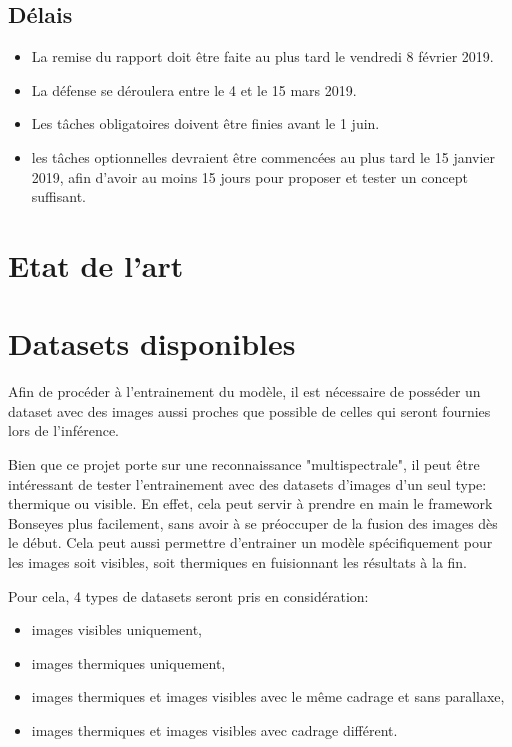 \subsection{Délais}
\begin{itemize}
	\item La remise du rapport doit être faite au plus tard le vendredi 8 février 2019.
	\item La défense se déroulera entre le 4 et le 15 mars 2019.
	\item Les tâches obligatoires doivent être finies avant le 1\ier{} juin.
	\item les tâches optionnelles devraient être commencées au plus tard le 15 janvier 2019, afin d'avoir au moins 15 jours pour proposer et tester un concept suffisant.
\end{itemize}


\section{Etat de l'art}


\section{Datasets disponibles}
Afin de procéder à l'entrainement du modèle, il est nécessaire de posséder un dataset avec des images aussi proches que possible de celles qui seront fournies lors de l'inférence.

Bien que ce projet porte sur une reconnaissance "multispectrale", il peut être intéressant de tester l'entrainement avec des datasets d'images d'un seul type: thermique ou visible.
En effet, cela peut servir à prendre en main le framework Bonseyes plus facilement, sans avoir à se préoccuper de la fusion des images dès le début.
Cela peut aussi permettre d'entrainer un modèle spécifiquement pour les images soit visibles, soit thermiques en fuisionnant les résultats à la fin.

Pour cela, 4 types de datasets seront pris en considération:
\begin{itemize}
	\item images visibles uniquement,
	\item images thermiques uniquement,
	\item images thermiques et images visibles avec le même cadrage et sans parallaxe,
	\item images thermiques et images visibles avec cadrage différent.
\end{itemize}

